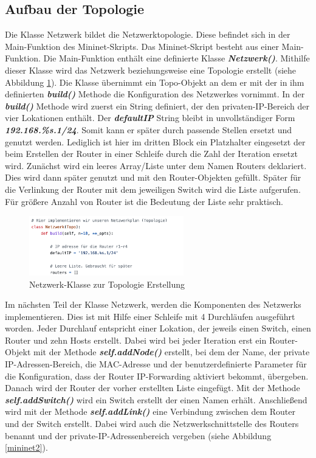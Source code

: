 \documentclass[fontsize=12pt,paper=a4,open=any,parskip=half,
  twoside=false,toc=listof,toc=bibliography,fleqn,leqno,
  captions=nooneline,captions=tableabove,british]{scrbook}
\begin{document}
\subsection{Aufbau der Topologie}
Die Klasse Netzwerk bildet die Netzwerktopologie. Diese befindet sich in der Main-Funktion des Mininet-Skripts. Das Mininet-Skript besteht aus einer Main-Funktion. Die Main-Funktion enthält eine definierte Klasse \textit{\textbf{Netzwerk()}}. Mithilfe dieser Klasse wird das Netzwerk beziehungsweise eine Topologie erstellt (siehe Abbildung \ref{mininet1}). Die Klasse übernimmt ein Topo-Objekt an dem er mit der in ihm definierten \textit{\textbf{build()}} Methode die Konfiguration des Netzwerkes vornimmt. In der \textit{\textbf{build()}} Methode wird zuerst ein String definiert, der den privaten-IP-Bereich der vier Lokationen enthält. Der \textit{\textbf{defaultIP}} String bleibt in unvollständiger Form \textit{\textbf{192.168.\%s.1/24}}. Somit kann er später durch passende Stellen ersetzt und genutzt werden. Lediglich ist hier im dritten Block ein Platzhalter eingesetzt der beim Erstellen der Router in einer Schleife durch die Zahl der Iteration ersetzt wird. Zunächst wird ein leeres Array/Liste unter dem Namen Routers deklariert. Dies wird dann später genutzt und mit den Router-Objekten gefüllt. Später für die Verlinkung der Router mit dem jeweiligen Switch wird die Liste aufgerufen. Für größere Anzahl von Router ist die Bedeutung der Liste sehr praktisch.

\begin{figure}[H]
 \centering
 \includegraphics[width=0.6\textwidth]{Bilder/mininet1}
 \captionsetup{justification=centering,margin=1cm}
 \caption{Netzwerk-Klasse zur Topologie Erstellung}
 \label{mininet1}
\end{figure}

Im nächsten Teil der Klasse Netzwerk, werden die Komponenten des Netzwerks implementieren. Dies ist mit Hilfe einer Schleife mit 4 Durchläufen ausgeführt worden. Jeder Durchlauf entspricht einer Lokation, der jeweils einen Switch, einen Router und zehn Hosts erstellt. Dabei wird bei jeder Iteration erst ein Router-Objekt mit der Methode \textit{\textbf{self.addNode()}} erstellt, bei dem der Name, der private IP-Adressen-Bereich, die MAC-Adresse und der benutzerdefinierte Parameter für die Konfiguration, dass der Router IP-Forwarding aktiviert bekommt, übergeben. Danach wird der Router der vorher erstellten Liste eingefügt. Mit der Methode \textit{\textbf{self.addSwitch()}} wird ein Switch erstellt der einen Namen erhält. Anschließend wird mit der Methode \textit{\textbf{self.addLink()}} eine Verbindung zwischen dem Router und der Switch erstellt. Dabei wird auch die Netzwerkschnittstelle des Routers benannt und der private-IP-Adressenbereich vergeben  (siehe Abbildung \ref{mininet2}).
\end{document}
